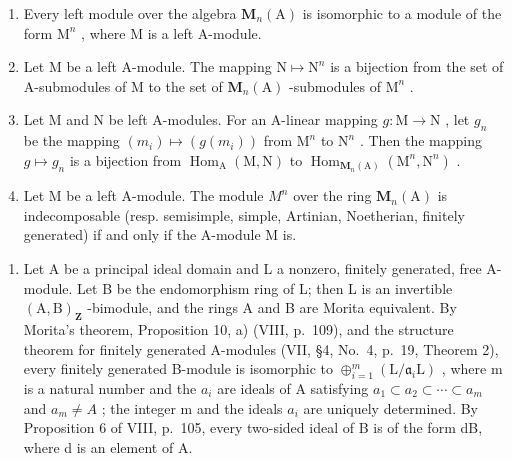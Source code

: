 \begin{enumerate}
\def\labelenumi{\alph{enumi})}
\item
  Every left module over the algebra \(\mathbf{M}_n(\mathrm{A})\) is isomorphic to a module of the form \(\mathrm{M}^n\) , where \(\mathrm{M}\) is a left A-module.
\item
  Let \(\mathrm{M}\) be a left A-module. The mapping \(\mathrm{N} \mapsto \mathrm{N}^n\) is a bijection from the set of A-submodules of \(\mathrm{M}\) to the set of \(\mathbf{M}_n(\mathrm{A})\) -submodules of \(\mathrm{M}^n\) .
\item
  Let M and N be left A-modules. For an A-linear mapping \(g: \mathrm{M} \to \mathrm{N}\) , let \(g_{n}\) be the mapping \((m_{i}) \mapsto (g(m_{i}))\) from \(\mathrm{M}^{n}\) to \(\mathrm{N}^{n}\) . Then the mapping \(g \mapsto g_{n}\) is a bijection from \(\operatorname{Hom}_{\mathrm{A}}(\mathrm{M}, \mathrm{N})\) to \(\operatorname{Hom}_{\mathbf{M}_{n}(\mathrm{A})}(\mathrm{M}^{n}, \mathrm{N}^{n})\) .
\item
  Let M be a left A-module. The module \(M^{n}\) over the ring \(\mathbf{M}_{n}(\mathrm{A})\) is indecomposable (resp. semisimple, simple, Artinian, Noetherian, finitely generated) if and only if the A-module M is.
\end{enumerate}

\begin{enumerate}
\def\labelenumi{\arabic{enumi})}
\setcounter{enumi}{2}
\tightlist
\item
  Let A be a principal ideal domain and L a nonzero, finitely generated, free A-module. Let B be the endomorphism ring of L; then L is an invertible \((\mathrm{A},\mathrm{B})_{\mathbf{Z}}\) -bimodule, and the rings A and B are Morita equivalent. By Morita's theorem, Proposition 10, a) (VIII, p.~109), and the structure theorem for finitely generated A-modules (VII, §4, No.~4, p.~19, Theorem 2), every finitely generated B-module is isomorphic to \(\oplus_{i=1}^{m}(\mathrm{L}/\mathfrak{a}_{i}\mathrm{L})\) , where m is a natural number and the \(a_{i}\) are ideals of A satisfying \(a_{1} \subset a_{2} \subset \cdots \subset a_{m}\) and \(a_{m} \neq A\) ; the integer m and the ideals \(a_{i}\) are uniquely determined. By Proposition 6 of VIII, p.~105, every two-sided ideal of B is of the form dB, where d is an element of A.
\end{enumerate}

